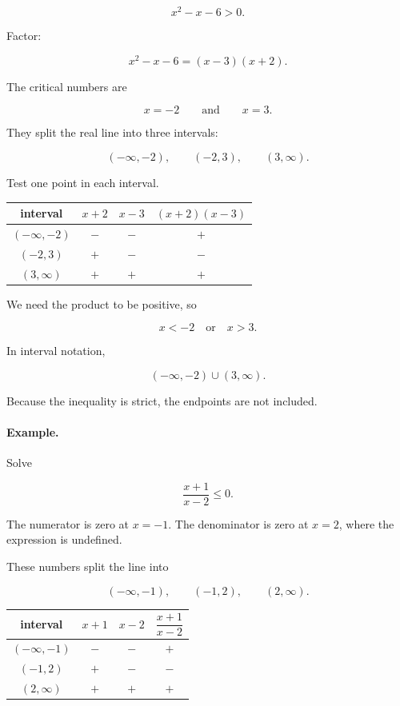 \[
x^2-x-6>0.
\]

Factor:

\[
x^2-x-6=(x-3)(x+2).
\]

The critical numbers are

\[
x=-2
\qquad\text{and}\qquad
x=3.
\]

They split the real line into three intervals:

\[
(-\infty,-2),
\qquad
(-2,3),
\qquad
(3,\infty).
\]

Test one point in each interval.

\begin{center}
\renewcommand{\arraystretch}{1.4}
\begin{tabular}{c|c|c|c}
\textbf{interval} & \(x+2\) & \(x-3\) & \((x+2)(x-3)\) \\ \hline
\((-\infty,-2)\) & \(-\) & \(-\) & \(+\) \\
\((-2,3)\) & \(+\) & \(-\) & \(-\) \\
\((3,\infty)\) & \(+\) & \(+\) & \(+\)
\end{tabular}
\end{center}

We need the product to be positive, so

\[
\boxed{
x<-2
\quad\text{or}\quad
x>3.
}
\]

In interval notation,

\[
\boxed{
(-\infty,-2)\cup(3,\infty).
}
\]

Because the inequality is strict, the endpoints are not included.

\paragraph{Example.}
Solve

\[
\frac{x+1}{x-2}\le0.
\]

The numerator is zero at \(x=-1\).  The denominator is zero at \(x=2\), where the
expression is undefined.

These numbers split the line into

\[
(-\infty,-1),
\qquad
(-1,2),
\qquad
(2,\infty).
\]

\begin{center}
\renewcommand{\arraystretch}{1.4}
\begin{tabular}{c|c|c|c}
\textbf{interval} & \(x+1\) & \(x-2\) & \(\dfrac{x+1}{x-2}\) \\ \hline
\((-\infty,-1)\) & \(-\) & \(-\) & \(+\) \\
\((-1,2)\) & \(+\) & \(-\) & \(-\) \\
\((2,\infty)\) & \(+\) & \(+\) & \(+\)
\end{tabular}
\end{center}

